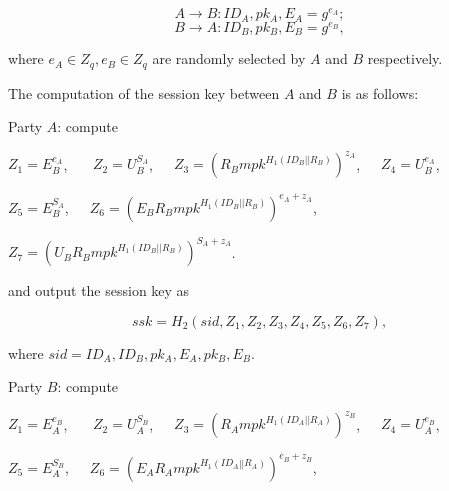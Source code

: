 \documentclass[final,1p,times,twocolumn]{elsarticle}
\begin{document}
\vspace{0.1cm}

$$A\rightarrow B: ID_{A},pk_{A},E_{A}=g^{e_{A}};$$
$$B\rightarrow A: ID_{B},pk_{B},E_{B}=g^{e_{B}},$$

\vspace{0.1cm}

where $e_{A}\in Z_{q},e_{B}\in Z_{q}$ are randomly selected by $A$ and $B$ respectively.

The computation of the session key between $A$ and $B$ is as follows:

Party $A$: compute

\vspace{0.1cm}

$Z_{1}=E_{B}^{e_{A}}$, \ \ \ $Z_{2}=U_{B}^{S_{A}}$,\ \ \ $Z_{3}=(R_{B}mpk^{H_{1}(ID_{B}||R_{B})})^{z_{A}}$,\ \ \ $Z_{4}=U_{B}^{e_{A}}$,

\vspace{0.1cm}

$Z_{5}=E_{B}^{S_{A}}$,\ \ \  $Z_{6}=(E_{B}R_{B}mpk^{H_{1}(ID_{B}||R_{B})})^{e_{A}+z_{A}}$,\ \ \ \

\vspace{0.1cm}

$Z_{7}=(U_{B}R_{B}mpk^{H_{1}(ID_{B}||R_{B})})^{S_{A}+z_{A}}$.

\vspace{0.1cm}

and output the session key as

\vspace{0.1cm}

$$ssk=H_{2}(sid,Z_{1},Z_{2},Z_{3},Z_{4},Z_{5},Z_{6},Z_{7}),$$

\vspace{0.1cm}

where $sid=ID_{A},ID_{B},pk_{A},E_{A},pk_{B},E_{B}$.

\vspace{0.2cm}

Party $B$: compute

\vspace{0.1cm}

$Z_{1}=E_{A}^{e_{B}}$, \ \ \ $Z_{2}=U_{A}^{S_{B}}$,\ \ \ $Z_{3}=(R_{A}mpk^{H_{1}(ID_{A}||R_{A})})^{z_{B}}$,\ \ \ $Z_{4}=U_{A}^{e_{B}}$,

\vspace{0.1cm}

$Z_{5}=E_{A}^{S_{B}}$,\ \ \  $Z_{6}=(E_{A}R_{A}mpk^{H_{1}(ID_{A}||R_{A})})^{e_{B}+z_{B}}$,\ \ \ \

\vspace{0.1cm}
\end{document}
